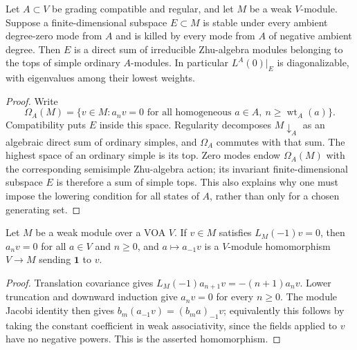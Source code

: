 \begin{lemma}
\label{lem:compatible-top}
Let $A\subset V$ be grading compatible and regular, and let $M$ be a
weak $V$-module. Suppose a finite-dimensional subspace $E\subset M$ is
stable under every ambient degree-zero mode from $A$ and is killed by
every mode from $A$ of negative ambient degree. Then $E$ is a direct
sum of irreducible Zhu-algebra modules belonging to the tops of simple
ordinary $A$-modules. In particular $L^A(0)|_E$ is diagonalizable,
with eigenvalues among their lowest weights.
\end{lemma}
\begin{proof}
Write
\[
 \Omega_A(M)=\{v\in M:a_nv=0\text{ for all homogeneous }a\in A,
                   \ n\ge\operatorname{wt}_A(a)\}.
\]
Compatibility puts $E$ inside this space. Regularity decomposes
$M\downarrow_A$ as an algebraic direct sum of ordinary simples, and
$\Omega_A$ commutes with that sum. The highest space of an ordinary
simple is its top. Zero modes endow $\Omega_A(M)$ with the corresponding
semisimple Zhu-algebra action; its invariant finite-dimensional
subspace $E$ is therefore a sum of simple tops. This also explains why
one must impose the lowering condition for all states of $A$, rather
than only for a chosen generating set.
\end{proof}

\begin{lemma}\label{lem:vacuum-like}
Let $M$ be a weak module over a VOA $V$. If $v\in M$ satisfies
$L_M(-1)v=0$, then $a_nv=0$ for all $a\in V$ and $n\ge0$, and
$a\mapsto a_{-1}v$ is a $V$-module homomorphism $V\to M$ sending
$\mathbf1$ to $v$.
\end{lemma}
\begin{proof}
Translation covariance gives
$L_M(-1)a_{n+1}v=-(n+1)a_nv$. Lower truncation and downward induction
give $a_nv=0$ for every $n\ge0$. The module Jacobi identity then gives
$b_m(a_{-1}v)=(b_ma)_{-1}v$; equivalently this follows by taking the
constant coefficient in weak associativity, since the fields applied
to $v$ have no negative powers. This is the asserted homomorphism.
\end{proof}


